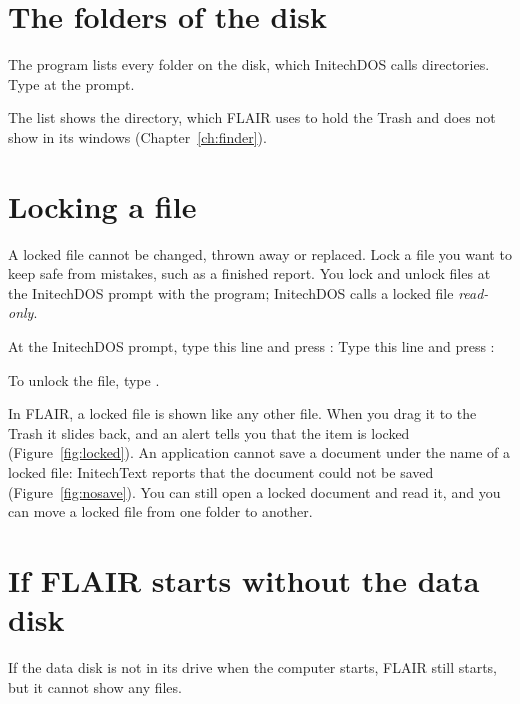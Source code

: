 \section{The folders of the disk}
The  program lists every folder on the disk, which InitechDOS
calls directories.  Type  at the prompt.


The list shows the  directory, which FLAIR uses to hold the
Trash and does not show in its windows (Chapter~\ref{ch:finder}).

\section{Locking a file}
A locked file cannot be changed, thrown away or replaced.  Lock a file you
want to keep safe from mistakes, such as a finished report.  You lock and
unlock files at the InitechDOS prompt with the  program;
InitechDOS calls a locked file \textit{read-only}.
\begin{TaskSteps}
\Step At the InitechDOS prompt, type this line and press :\newline
{}
\Step Type this line and press :\newline
{}
\end{TaskSteps}


To unlock the file, type .

In FLAIR, a locked file is shown like any other file.  When you drag it to
the Trash it slides back, and an alert tells you that the item is locked
(Figure~\ref{fig:locked}).  An application cannot save a document under the
name of a locked file: InitechText reports that the document could not be
saved (Figure~\ref{fig:nosave}).  You can still open a locked document and
read it, and you can move a locked file from one folder to another.

\section{If FLAIR starts without the data disk}
If the data disk is not in its drive when the computer starts, FLAIR still
starts, but it cannot show any files.

